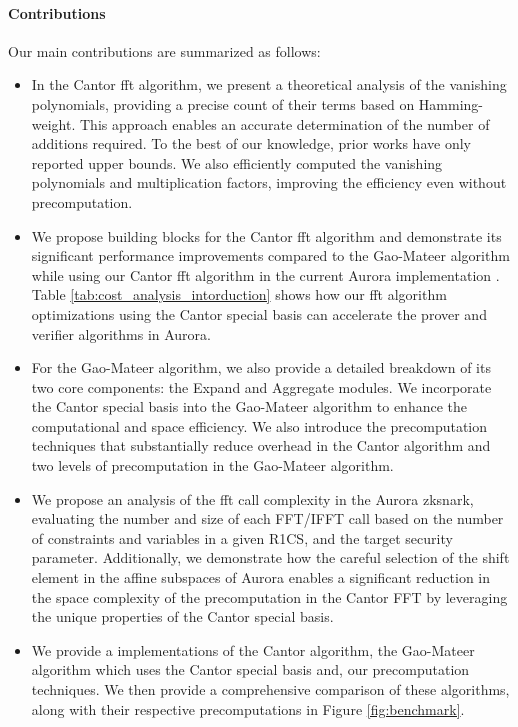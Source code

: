 \paragraph{Contributions} Our main contributions are summarized as follows:

\begin{itemize}
	\item In the Cantor \gls{fft} algorithm, we present a theoretical analysis of the vanishing polynomials, providing a precise count of their terms based on Hamming-weight. This approach enables an accurate determination of the number of additions required. To the best of our knowledge, prior works have only reported upper bounds. We also efficiently computed the vanishing polynomials and multiplication factors, improving the efficiency even without precomputation.
	
	\item We propose building blocks for the Cantor \gls{fft} algorithm and demonstrate its significant performance improvements compared to the Gao-Mateer algorithm while using our Cantor \gls{fft}  algorithm in the current Aurora implementation \cite{libiop}. Table \ref{tab:cost_analysis_intorduction} shows how our \gls{fft}  algorithm optimizations using the Cantor special basis can accelerate the prover and verifier algorithms in Aurora.
	
	\item  For the Gao-Mateer algorithm, we also provide a detailed breakdown of its two core components: the \textsf{Expand} and \textsf{Aggregate} modules. We incorporate the Cantor special basis into the Gao-Mateer algorithm to enhance the computational and space efficiency.
	We also introduce the precomputation techniques that substantially reduce overhead in the Cantor algorithm and two levels of precomputation in the Gao-Mateer algorithm.
	
	\item We propose an analysis of the \gls{fft} call complexity in the Aurora \gls{zksnark}, evaluating the number and size of each FFT/IFFT call based on the number of constraints and variables in a given R1CS, and the target security parameter. Additionally, we demonstrate how the careful selection of the shift element in the affine subspaces of Aurora enables a significant reduction in the space complexity of the precomputation in the Cantor FFT by leveraging the unique properties of the Cantor special basis.
	
	\item We provide a \CC  implementations of the Cantor algorithm, the Gao-Mateer algorithm which uses the Cantor special basis and, our precomputation techniques. We then provide a comprehensive comparison of these algorithms, along with their respective precomputations in Figure \ref{fig:benchmark}. 
	

\end{itemize}
